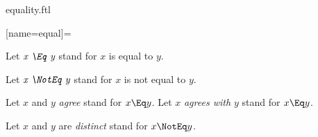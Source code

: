 \documentclass{stex}
\begin{document}
\begin{smodule}{equality.ftl}

[name=equal]{\;\comp=\;}

\begin{fakeforthel}
  \begin{convention}[for=Eq]
    Let $\emph{x \Eq y}$ stand for $x$ is equal to $y$.
  \end{convention}
\end{fakeforthel}

\begin{fakeforthel}
  \begin{convention}[for=NotEq]
    Let $\emph{x \NotEq y}$ stand for $x$ is not equal to $y$.
  \end{convention}
\end{fakeforthel}

\begin{forthel}
  \begin{convention}[for=agree]
    Let $x$ and $y$ \emph{agree} stand for $x \Eq y$.
    Let $x$ \emph{agrees with $y$} stand for $x \Eq y$.
  \end{convention}
\end{forthel}

\begin{forthel}
  \begin{convention}[for=distinct]
    Let $x$ and $y$ are \emph{distinct} stand for $x \NotEq y$.
  \end{convention}
\end{forthel}

\end{smodule}
\end{document}
